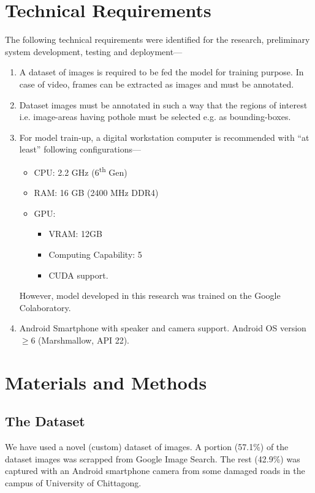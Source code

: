 \documentclass[conference]{IEEEtran}
\begin{document}
\section{Technical Requirements}
The following technical requirements were identified for the research, preliminary system development, testing and deployment---
\begin{enumerate}
  \item A dataset of images is required to be fed the model for training purpose. In case of video, frames can be extracted\cite{schultz1996extraction} as images and must be annotated.
           
  \item Dataset images must be annotated in such a way that the regions of interest i.e. image-areas having pothole must be selected e.g. as bounding-boxes\cite{lempitsky2009image}.
           
  \item For model train-up, a digital workstation\cite{pirkle1988computer} computer is recommended with ``at least'' following configurations---
        \begin{itemize}
          \item CPU: 2.2 GHz (6\textsuperscript{th} Gen)
          \item RAM: 16 GB (2400 MHz DDR4)
          \item GPU:
                \begin{itemize}
                  \item VRAM: 12GB
                  \item Computing\cite{owens2008gpu} Capability: 5
                  \item CUDA\cite{kirk2007nvidia} support.
                \end{itemize}
        \end{itemize}
        However, model developed in this research was trained on the Google Colaboratory\cite{bisong2019google}.
           
  \item Android\cite{android2011android} Smartphone with speaker and camera support. Android OS version $\geq 6$ (Marshmallow, API 22).
\end{enumerate}

\section{Materials and Methods}
\subsection{The Dataset}
We have used a novel (custom) dataset of images. A portion (57.1\%) of the dataset images was scrapped from Google Image Search. The rest (42.9\%) was captured with an Android smartphone camera from some damaged roads in the campus of University of Chittagong. 
   
\end{document}
